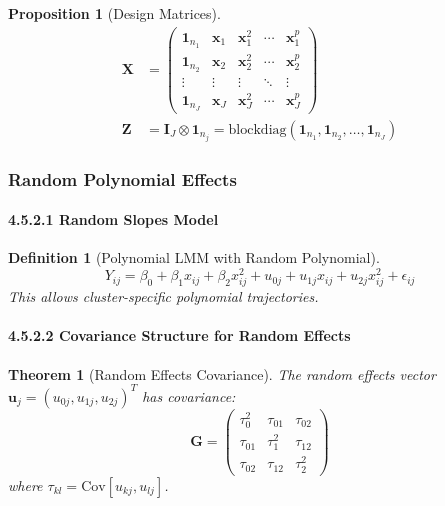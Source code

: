 \documentclass{article}
\newtheorem{definition}{Definition}
\newtheorem{theorem}{Theorem}
\newtheorem{proposition}{Proposition}
\begin{document}
\begin{proposition}[Design Matrices]
\begin{align}
\mathbf{X} &= \begin{pmatrix}
\mathbf{1}_{n_1} & \mathbf{x}_1 & \mathbf{x}_1^2 & \cdots & \mathbf{x}_1^p \\
\mathbf{1}_{n_2} & \mathbf{x}_2 & \mathbf{x}_2^2 & \cdots & \mathbf{x}_2^p \\
\vdots & \vdots & \vdots & \ddots & \vdots \\
\mathbf{1}_{n_J} & \mathbf{x}_J & \mathbf{x}_J^2 & \cdots & \mathbf{x}_J^p
\end{pmatrix} \\
\mathbf{Z} &= \mathbf{I}_J \otimes \mathbf{1}_{n_j} = \text{blockdiag}(\mathbf{1}_{n_1}, \mathbf{1}_{n_2}, \ldots, \mathbf{1}_{n_J})
\end{align}
\end{proposition}

\subsubsection{Random Polynomial Effects}

\paragraph{4.5.2.1 Random Slopes Model}

\begin{definition}[Polynomial LMM with Random Polynomial]
\begin{equation}
Y_{ij} = \beta_0 + \beta_1 x_{ij} + \beta_2 x_{ij}^2 + u_{0j} + u_{1j}x_{ij} + u_{2j}x_{ij}^2 + \epsilon_{ij}
\end{equation}
This allows cluster-specific polynomial trajectories.
\end{definition}

\paragraph{4.5.2.2 Covariance Structure for Random Effects}

\begin{theorem}[Random Effects Covariance]
The random effects vector $\mathbf{u}_j = (u_{0j}, u_{1j}, u_{2j})^T$ has covariance:
\begin{equation}
\mathbf{G} = \begin{pmatrix}
\tau_0^2 & \tau_{01} & \tau_{02} \\
\tau_{01} & \tau_1^2 & \tau_{12} \\
\tau_{02} & \tau_{12} & \tau_2^2
\end{pmatrix}
\end{equation}
where $\tau_{kl} = \text{Cov}[u_{kj}, u_{lj}]$.
\end{theorem}
\end{document}
